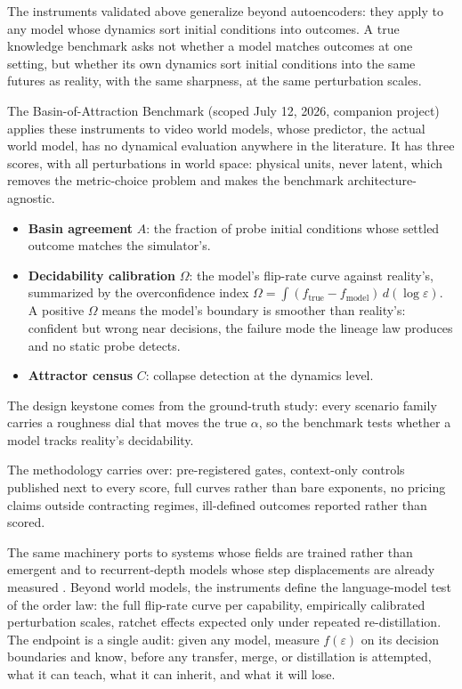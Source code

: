 \documentclass[11pt]{article}
\begin{document}
The instruments validated above generalize beyond autoencoders: they apply to any model whose dynamics sort initial conditions into outcomes. A true knowledge benchmark asks not whether a model matches outcomes at one setting, but whether its own dynamics sort initial conditions into the same futures as reality, with the same sharpness, at the same perturbation scales.

The Basin-of-Attraction Benchmark (scoped July 12, 2026, companion project) applies these instruments to video world models, whose predictor, the actual world model, has no dynamical evaluation anywhere in the literature. It has three scores, with all perturbations in world space: physical units, never latent, which removes the metric-choice problem and makes the benchmark architecture-agnostic.

\begin{itemize}\setlength{\itemsep}{0.6em}
  \item \textbf{Basin agreement} $A$: the fraction of probe initial conditions whose settled outcome matches the simulator's.
  \item \textbf{Decidability calibration} $\Omega$: the model's flip-rate curve against reality's, summarized by the overconfidence index $\Omega = \int (f_{\mathrm{true}} - f_{\mathrm{model}})\, d(\log \varepsilon)$. A positive $\Omega$ means the model's boundary is smoother than reality's: confident but wrong near decisions, the failure mode the lineage law produces and no static probe detects.
  \item \textbf{Attractor census} $C$: collapse detection at the dynamics level.
\end{itemize}

The design keystone comes from the ground-truth study: every scenario family carries a roughness dial that moves the true $\alpha$, so the benchmark tests whether a model tracks reality's decidability.

The methodology carries over: pre-registered gates, context-only controls published next to every score, full curves rather than bare exponents, no pricing claims outside contracting regimes, ill-defined outcomes reported rather than scored.

The same machinery ports to systems whose fields are trained rather than emergent \citep{ho2020ddpm,song2021score} and to recurrent-depth models whose step displacements are already measured \citep{pappone2025}. Beyond world models, the instruments define the language-model test of the order law: the full flip-rate curve per capability, empirically calibrated perturbation scales, ratchet effects expected only under repeated re-distillation. The endpoint is a single audit: given any model, measure $f(\varepsilon)$ on its decision boundaries and know, before any transfer, merge, or distillation is attempted, what it can teach, what it can inherit, and what it will lose.
\end{document}
